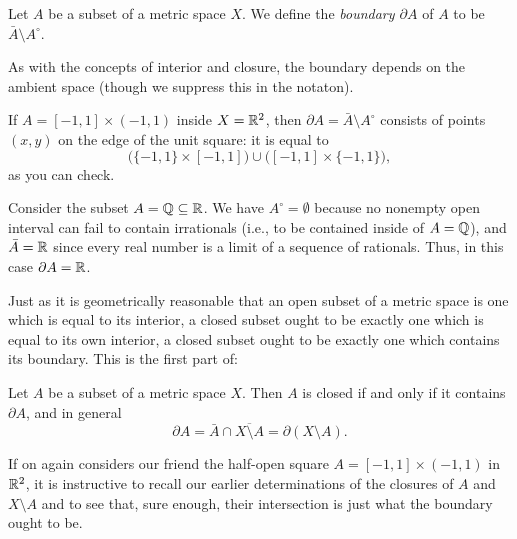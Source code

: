\begin{definition}
  Let \(A\) be a subset of a metric space \(X\). We define the
  \emph{boundary \(\partial A\)} of \(A\) to be \(\bar A\setminus
  A^\circ\).
\end{definition}

As with the concepts of interior and closure, the boundary depends on the
ambient space (though we suppress this in the notaton).

\begin{example}
  If \(A=[-1,1]\times(-1,1)\) inside \(X=\mathbb{R}^2\), then \(\partial A=\bar
  A\setminus A^\circ\) consists of points \((x,y)\) on the edge of the unit
  square: it is equal to
  \[
    \bigl(\{-1,1\}\times[-1,1]\bigr)\cup
    \bigl([-1,1]\times\{-1,1\}\bigr),
  \]
  as you can check.
\end{example}

\begin{example}
  Consider the subset \(A=\mathbb{Q}\subseteq\mathbb{R}\). We have
  \(A^\circ=\emptyset\) because no nonempty open interval can fail to
  contain irrationals (i.e., to be contained inside of \(A=\mathbb{Q}\)), and
  \(\bar A=\mathbb{R}\) since every real number is a limit of a sequence of
  rationals. Thus, in this case \(\partial A=\mathbb{R}\).
\end{example}

Just as it is geometrically reasonable that an open subset of a metric
space is one which is equal to its interior, a closed subset ought to be
exactly one which is equal to its own interior, a closed subset ought to be
exactly one which contains its boundary. This is the first part of:

\begin{theorem}
  Let \(A\) be a subset of a metric space \(X\). Then \(A\) is closed if
  and only if it contains \(\partial A\), and in general
  \[
    \partial A=\bar A\cap\overline{X\setminus A}=\partial(X\setminus A).
  \]
\end{theorem}

If on again considers our friend the half-open square
\(A=[-1,1]\times(-1,1)\) in \(\mathbb{R}^2\), it is instructive to recall our
earlier determinations of the closures of \(A\) and \(X\setminus A\) and to
see that, sure enough, their intersection is just what the boundary ought
to be.

